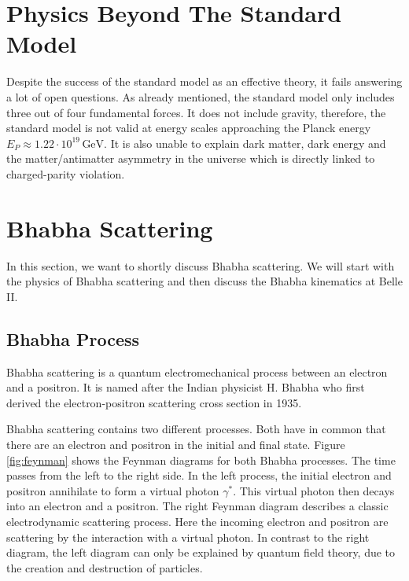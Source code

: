 \documentclass[a4paper,11pt,twosided,final,german,openbib,pdftex,listof=totoc,bibliography=totoc]{scrbook}
\begin{document}
\section{Physics Beyond The Standard Model}

Despite the success of the standard model as an effective theory, it fails answering a lot of open questions. As already mentioned, the standard model only includes three out of four fundamental forces. It does not include gravity, therefore, the standard model is not valid at energy scales approaching the Planck energy $E_P \approx 1.22\cdot 10^{19}\,\textrm{GeV} $.\cite{sivaram2007special} It is also unable to explain dark matter, dark energy and the matter/antimatter asymmetry in the universe which is directly linked to charged-parity violation.\cite{HAMBYE2012193}

\section{Bhabha Scattering}
\label{sec:Bhabha}

In this section, we want to shortly discuss Bhabha scattering. We will start with the physics of Bhabha scattering and then discuss the Bhabha kinematics at Belle II.
 
\subsection{Bhabha Process}
 \label{sec:BhabhaProcess}
 Bhabha scattering is a quantum electromechanical process between an electron and a positron. It is named after the Indian  physicist H. Bhabha who first derived the electron-positron scattering cross section in 1935.\cite{Bhabha}
 
 Bhabha scattering contains two different processes. Both have in common that there are an electron and positron in the initial and final state. Figure \ref{fig:feynman} shows the Feynman diagrams for both Bhabha processes. The time passes from the left to the right side. In the left process, the initial electron and positron annihilate to form a virtual photon $\gamma^\ast$. This virtual photon then decays into an electron and a positron. The right Feynman diagram describes a classic electrodynamic scattering process. Here the incoming electron and positron are scattering by the interaction with a virtual photon. In contrast to the right diagram, the left diagram can only be explained by quantum field theory, due to the creation and destruction of particles.
 
\end{document}

